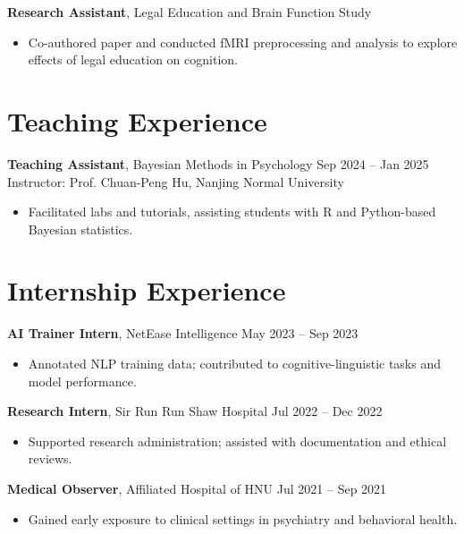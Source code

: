 \documentclass[letterpaper,11pt,oneside]{article}
\begin{document}
\textbf{Research Assistant}, Legal Education and Brain Function Study \\
\begin{itemize}[leftmargin=*]
    \item Co-authored paper and conducted fMRI preprocessing and analysis to explore effects of legal education on cognition.
\end{itemize}

\section*{Teaching Experience}
\textbf{Teaching Assistant}, Bayesian Methods in Psychology \hfill Sep 2024 -- Jan 2025 \\
Instructor: Prof. Chuan-Peng Hu, Nanjing Normal University \\
\begin{itemize}[leftmargin=*]
    \item Facilitated labs and tutorials, assisting students with R and Python-based Bayesian statistics.
\end{itemize}

\section*{Internship Experience}
\textbf{AI Trainer Intern}, NetEase Intelligence \hfill May 2023 -- Sep 2023 \\
\begin{itemize}[leftmargin=*]
    \item Annotated NLP training data; contributed to cognitive-linguistic tasks and model performance.
\end{itemize}

\textbf{Research Intern}, Sir Run Run Shaw Hospital \hfill Jul 2022 -- Dec 2022 \\
\begin{itemize}[leftmargin=*]
    \item Supported research administration; assisted with documentation and ethical reviews.
\end{itemize}

\textbf{Medical Observer}, Affiliated Hospital of HNU \hfill Jul 2021 -- Sep 2021 \\
\begin{itemize}[leftmargin=*]
    \item Gained early exposure to clinical settings in psychiatry and behavioral health.
\end{itemize}
\end{document}
